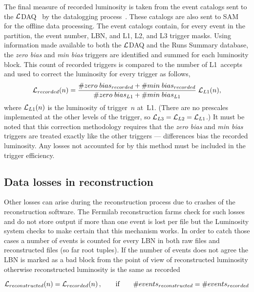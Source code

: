 \documentclass[12pt]{article}
\begin{document}
The final measure of recorded luminosity is taken from the event
catalogs sent to the $\cal L$DAQ~\cite{XXXX-LDAQ} by the datalogging
process~\cite{3982}.  These catalogs are also sent to SAM~\cite{3465}
for the offline data processing.  The event catalogs contain, for
every event in the partition, the event number, LBN, and L1, L2, and
L3 trigger masks.  Using information made available to both the $\cal
L$DAQ and the Runs Summary database, the {\it zero bias} and {\it min
bias} triggers are identified and summed for each luminosity block.
This count of recorded triggers is compared to the number of
L1~accepts and used to correct the luminosity for every trigger as
follows,
\begin{equation}
{\cal L}_{recorded}(n) = {\# zero\;bias_{recorded} + \#
min\;bias_{recorded} \over \# zero\;bias_{L1} + \# min\;bias_{L1}}
\;{\cal L}_{L1}(n),
\label{eq:recorded}
\end{equation}
where ${\cal L}_{L1}(n)$ is the luminosity of trigger~$n$
at~L1. (There are no prescales implemented at the other levels of the
trigger, so ${\cal L}_{L3} = {\cal L}_{L2} = {\cal L}_{L1}$.)  It must
be noted that this correction methodology requires that the {\it zero
bias} and {\it min bias} triggers are treated exactly like the other
triggers --- differences bias the recorded luminosity.  Any losses not
accounted for by this method must be included in the trigger
efficiency.

\subsection{Data losses in reconstruction}

Other losses can arise during the reconstruction process due to crashes
of the reconstruction software. The Fermilab reconstruction farms
check for such losses and do not store output if more than one event
is lost per file but the Luminosity system checks to make certain
that this mechanism works. In order to catch those cases a number of
events is counted for every LBN in both raw files and reconstructed files
(so far root tuples). If the number of events does not agree the LBN
is marked as a bad block from the point of view of reconstructed luminosity
otherwise reconstructed luminosity is the same as recorded


\begin{equation}
{\cal L}_{reconstructed}(n) = {\cal L}_{recorded}(n)\,,\qquad
\hbox{if}\qquad \#events_{reconstructed} = \#events_{recorded}
\label{eq:reconstructed}
\end{equation}
\end{document}
